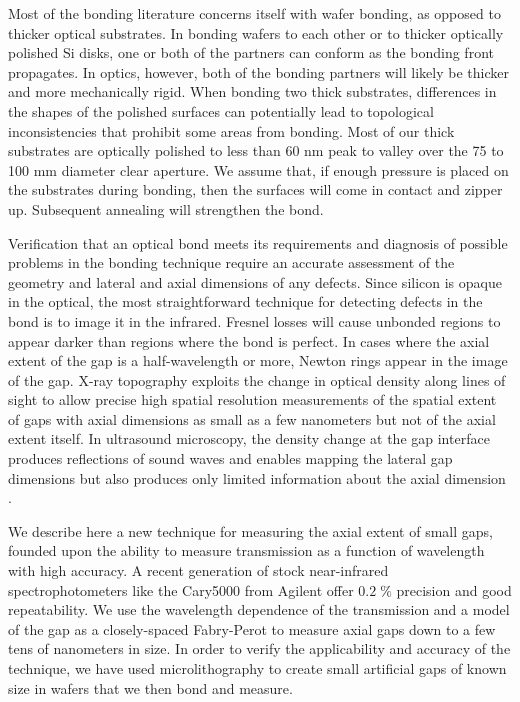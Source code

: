 \documentclass[osajnl,preprint,showpacs,superscriptaddress,12pt]{revtex4-1} %
\begin{document}
Most of the bonding literature concerns itself with wafer bonding, as opposed to thicker optical substrates.  In bonding wafers to each other or to thicker optically polished Si disks, one or both of the partners can conform as the bonding front propagates.  In optics, however, both of the bonding partners will likely be thicker and more mechanically rigid.  When bonding two thick substrates, differences in the shapes of the polished surfaces can potentially lead to topological inconsistencies that prohibit some areas from bonding.  Most of our thick substrates are optically polished to less than 60 nm peak to valley over the 75 to 100 mm diameter clear aperture.  We assume that, if enough pressure is placed on the substrates during bonding, then the surfaces will come in contact and zipper up.  Subsequent annealing will strengthen the bond.


Verification that an optical bond meets its requirements and diagnosis of possible problems in the bonding technique require an accurate assessment of the geometry and lateral and axial dimensions of any defects.  Since silicon is opaque in the optical, the most straightforward technique for detecting defects in the bond is to image it in the infrared.  Fresnel losses will cause unbonded regions to appear darker than regions where the bond is perfect.  In cases where the axial extent of the gap is a half-wavelength or more, Newton rings appear in the image of the gap.  X-ray topography \cite{Mitani1990} exploits the change in optical density along lines of sight to allow precise high spatial resolution measurements of the spatial extent of gaps with axial dimensions as small as a few nanometers but not of the axial extent itself. In ultrasound microscopy, the density change at the gap interface produces reflections of sound waves and enables mapping the lateral gap dimensions but also produces only limited information about the axial dimension \cite{2000RScI...71.1869G}.


We describe here a new technique for measuring the axial extent of small gaps, founded upon the ability to measure transmission as a function of wavelength with high accuracy.   A recent generation of stock near-infrared spectrophotometers like the Cary5000 from Agilent offer $0.2\;\%$ precision and good repeatability.  We use the wavelength dependence of the transmission and a model of the gap as a closely-spaced Fabry-Perot to measure axial gaps down to a few tens of nanometers in size.  In order to verify the applicability and accuracy of the technique, we have used microlithography to create small artificial gaps of known size in wafers that we then bond and measure.
\end{document}
